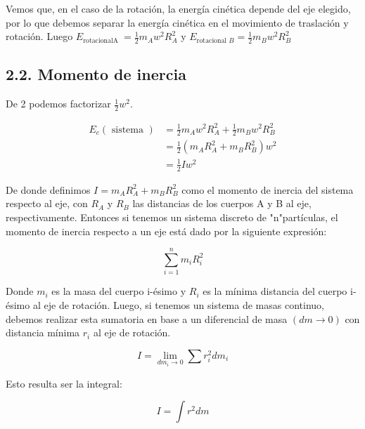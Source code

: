 \documentclass[10pt]{article}
\begin{document}
Vemos que, en el caso de la rotación, la energía cinética depende del eje elegido, por lo que debemos separar la energía cinética en el movimiento de traslación y rotación. Luego $E_{\text {rotacionalA }}=\frac{1}{2} m_{A} w^{2} R_{A}^{2}$ y $E_{\text {rotacional } B}=\frac{1}{2} m_{B} w^{2} R_{B}^{2}$

\subsection*{2.2. Momento de inercia}
De 2 podemos factorizar $\frac{1}{2} w^{2}$.

$$
\begin{aligned}
E_{c}(\text { sistema }) & =\frac{1}{2} m_{A} w^{2} R_{A}^{2}+\frac{1}{2} m_{B} w^{2} R_{B}^{2} \\
& =\frac{1}{2}\left(m_{A} R_{A}^{2}+m_{B} R_{B}^{2}\right) w^{2} \\
& =\frac{1}{2} I w^{2}
\end{aligned}
$$

De donde definimos $I=m_{A} R_{A}^{2}+m_{B} R_{B}^{2}$ como el momento de inercia del sistema respecto al eje, con $R_{A}$ y $R_{B}$ las distancias de los cuerpos A y B al eje, respectivamente. Entonces si tenemos un sistema discreto de "n"partículas, el momento de inercia respecto a un eje está dado por la siguiente expresión:


\begin{equation*}
\sum_{i=1}^{n} m_{i} R_{i}^{2} \tag{3}
\end{equation*}


Donde $m_{i}$ es la masa del cuerpo i-ésimo y $R_{i}$ es la mínima distancia del cuerpo i-ésimo al eje de rotación. Luego, si tenemos un sistema de masas continuo, debemos realizar esta sumatoria en base a un diferencial de masa $(d m \rightarrow 0)$ con distancia mínima $r_{i}$ al eje de rotación.


\begin{equation*}
I=\lim _{d m_{i} \rightarrow 0} \sum r_{i}^{2} d m_{i} \tag{4}
\end{equation*}


Esto resulta ser la integral:


\begin{equation*}
I=\int r^{2} d m \tag{5}
\end{equation*}
\end{document}
